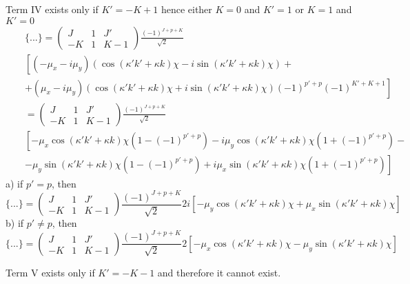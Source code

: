 Term IV exists only if $K' = -K +1$ hence either $K = 0$ and $K'=1$ or $K = 1$ and $K'=0$
\begin{eqnarray} \nonumber
&& \{...\} = 
\left( \begin{array}{ccc} 
 J &  1 &  J' \\
-K &  1 & K-1  \end{array} \right)
\frac{(-1)^{J+p+K}}{\sqrt{2}} \\ \nonumber
&& \left[ ( -\mu_x - i \mu_y) 
\left( \cos ( \kappa' k' + \kappa k) \chi - i \sin ( \kappa' k' + \kappa k) \chi \right) + \right. \\
&& \left.
+ ( \mu_x - i \mu_y)
\left( \cos ( \kappa' k' + \kappa k) \chi + i \sin ( \kappa' k' + \kappa k) \chi \right) (-1)^{p'+p} (-1)^{K'+K+1}
\right] \\ \nonumber
&& = 
\left( \begin{array}{ccc} 
 J &  1 &  J' \\
-K &  1 & K-1  \end{array} \right)
\frac{(-1)^{J+p+K}}{\sqrt{2}} \\ \nonumber
&& \left[ 
-  \mu_x \cos ( \kappa' k' + \kappa k) \chi \left( 1- (-1)^{p'+p} \right)
-i \mu_y \cos ( \kappa' k' + \kappa k) \chi \left( 1+ (-1)^{p'+p} \right) - \right. \\ 
&& \left.
-  \mu_y \sin ( \kappa' k' + \kappa k) \chi \left( 1- (-1)^{p'+p} \right)
+i \mu_x \sin ( \kappa' k' + \kappa k) \chi \left( 1+ (-1)^{p'+p} \right) \right]
\end{eqnarray}
a) if $p' = p$, then 
\begin{equation}
\{...\} = 
\left( \begin{array}{ccc} 
 J &  1 &  J' \\
-K &  1 & K-1  \end{array} \right)
\frac{(-1)^{J+p+K}}{\sqrt{2}} 2i \left[ 
- \mu_y \cos ( \kappa' k' + \kappa k) \chi +  \mu_x \sin ( \kappa' k' + \kappa k) \chi \right]
\end{equation}
b) if $p' \ne p$, then 
\begin{equation}
\{...\} = 
\left( \begin{array}{ccc} 
 J &  1 &  J' \\
-K &  1 & K-1  \end{array} \right)
\frac{(-1)^{J+p+K}}{\sqrt{2}} 2  \left[
- \mu_x \cos ( \kappa' k' + \kappa k) \chi -  \mu_y \sin ( \kappa' k' + \kappa k) \chi \right]
\end{equation}

Term V exists only if $K' = -K-1$ and therefore it cannot exist.

